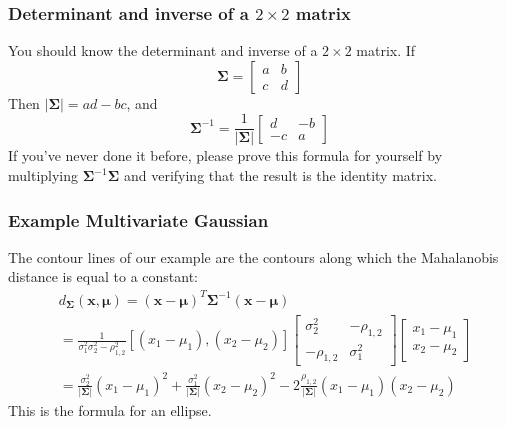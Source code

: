 \documentclass{beamer}
\begin{document}
\begin{frame}
  \frametitle{Determinant and inverse of a $2\times 2$ matrix}

  You should know the determinant and inverse of a $2\times 2$ matrix.  If
  \begin{displaymath}
    \bm{\Sigma}=\left[\begin{array}{cc}a&b\\c&d\end{array}\right]
  \end{displaymath}
  Then $|\bm{\Sigma}|=ad-bc$, and
  \begin{displaymath}
    \bm{\Sigma}^{-1}=\frac{1}{|\bm{\Sigma}|}\left[\begin{array}{cc}d&-b\\-c&a\end{array}\right]
  \end{displaymath}
  If you've never done it before, please prove this formula for
  yourself by multiplying $\bm{\Sigma}^{-1}\bm{\Sigma}$ and
  verifying that the result is the identity matrix.
\end{frame}

\begin{frame}
  \frametitle{Example Multivariate Gaussian}

  The contour lines of our example are the contours along which the
  Mahalanobis distance is equal to a constant:
  \begin{align*}
    &d_{\bm{\Sigma}}(\mathbf{x},\bm{\mu})
    = (\mathbf{x}-\bm{\mu})^T\bm{\Sigma}^{-1}(\mathbf{x}-\bm{\mu})\\
    &= \frac{1}{\sigma_1^2\sigma_2^2-\rho_{1,2}^2}
    [(x_1-\mu_1),(x_2-\mu_2)]
    \left[\begin{array}{cc}\sigma_2^2&-\rho_{1,2}\\-\rho_{1,2}&\sigma_1^2\end{array}\right]
    \left[\begin{array}{c}x_1-\mu_1\\x_2-\mu_2\end{array}\right]\\
    &=\frac{\sigma_2^2}{|\bm{\Sigma}|}(x_1-\mu_1)^2+
    \frac{\sigma_1^2}{|\bm{\Sigma}|}(x_2-\mu_2)^2-
    2\frac{\rho_{1,2}}{|\bm{\Sigma}|}(x_1-\mu_1)(x_2-\mu_2)
  \end{align*}
  This is the formula for an ellipse.
\end{frame}
\end{document}

